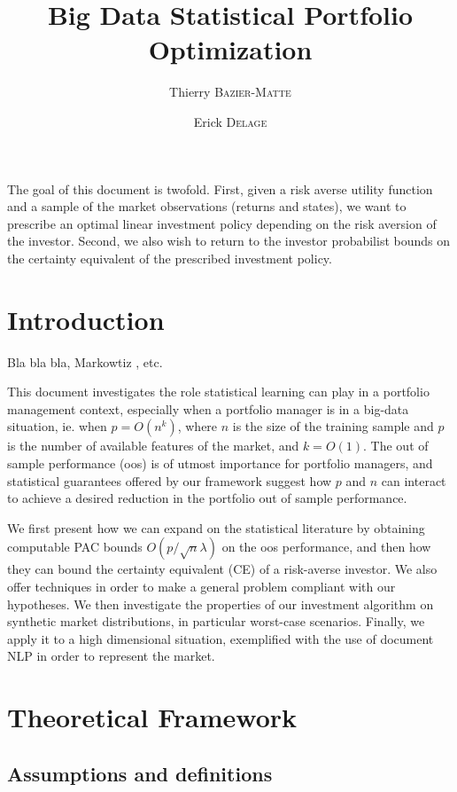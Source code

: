 \documentclass[11pt]{article}
\title{Big Data Statistical Portfolio Optimization}
\author{Thierry \textsc{Bazier-Matte} \and Erick \textsc{Delage}}
\begin{document}
\maketitle


The goal of this document is twofold. First, given a risk averse utility function and a
sample of the market observations (returns and states), we want to prescribe an optimal
linear investment policy depending on the risk aversion of the investor. Second, we also
wish to return to the investor probabilist bounds on the certainty equivalent of the
prescribed investment policy.

\section{Introduction}
\label{sec:intro}

Bla bla bla, Markowtiz \cite{markowitz1952portfolio}, etc.

This document investigates the role statistical learning can play in a portfolio
management context, especially when a portfolio manager is in a big-data situation,
ie. when $p=O(n^k)$, where $n$ is the size of the training sample and $p$ is the number of
available features of the market, and $k=O(1)$. The out of sample performance (oos) is of
utmost importance for portfolio managers, and statistical guarantees offered by our
framework suggest how $p$ and $n$ can interact to achieve a desired reduction in the
portfolio out of sample performance.

We first present how we can expand on the statistical literature by obtaining computable
PAC bounds $O(p/\sqrt{n}\lambda)$ on the oos performance, and then how they can bound the
certainty equivalent (CE) of a risk-averse investor. We also offer techniques in order to
make a general problem compliant with our hypotheses. We then investigate the properties
of our investment algorithm on synthetic market distributions, in particular worst-case
scenarios. Finally, we apply it to a high dimensional situation, exemplified with the use
of document NLP in order to represent the market.

\section{Theoretical Framework}

\subsection{Assumptions and definitions}
\end{document}
